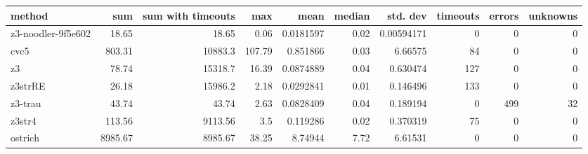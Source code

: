 \begin{tabular}{lrrrrrrrrr}
\hline
 method             &     sum &   sum with timeouts &    max &      mean &   median &   std. dev &   timeouts &   errors &   unknowns \\
\hline
 z3-noodler-9f5e602 &   18.65 &               18.65 &   0.06 & 0.0181597 &     0.02 & 0.00594171 &          0 &        0 &          0 \\
 cvc5               &  803.31 &            10883.3  & 107.79 & 0.851866  &     0.03 & 6.66575    &         84 &        0 &          0 \\
 z3                 &   78.74 &            15318.7  &  16.39 & 0.0874889 &     0.04 & 0.630474   &        127 &        0 &          0 \\
 z3strRE            &   26.18 &            15986.2  &   2.18 & 0.0292841 &     0.01 & 0.146496   &        133 &        0 &          0 \\
 z3-trau            &   43.74 &               43.74 &   2.63 & 0.0828409 &     0.04 & 0.189194   &          0 &      499 &         32 \\
 z3str4             &  113.56 &             9113.56 &   3.5  & 0.119286  &     0.02 & 0.370319   &         75 &        0 &          0 \\
 ostrich            & 8985.67 &             8985.67 &  38.25 & 8.74944   &     7.72 & 6.61531    &          0 &        0 &          0 \\
\hline
\end{tabular}

